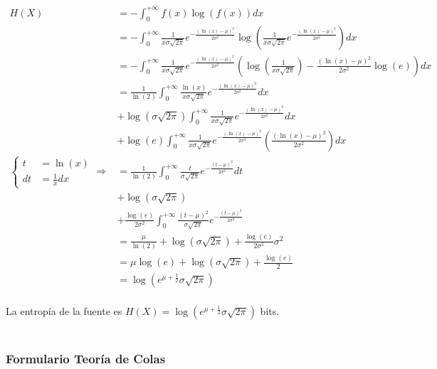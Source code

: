 \documentclass{article}
\begin{document}
\begin{align*}
H(X)&= -\int_{0}^{+\infty}f(x)\log\left(f(x)\right)dx\\
&= -\int_{0}^{+\infty}\frac{1}{x\sigma\sqrt{2\pi}}e^{-\frac{(\ln\left(x\right)-\mu)^2}{2\sigma^2}}\log\left(\frac{1}{x\sigma\sqrt{2\pi}}e^{-\frac{(\ln\left(x\right)-\mu)^2}{2\sigma^2}}\right)dx\\
&= -\int_{0}^{+\infty}\frac{1}{x\sigma\sqrt{2\pi}}e^{-\frac{(\ln\left(x\right)-\mu)^2}{2\sigma^2}}\left(\log\left(\frac{1}{x\sigma\sqrt{2\pi}}\right)-\frac{(\ln\left(x\right)-\mu)^2}{2\sigma^2}\log\left(e\right)\right)dx\\
&= \frac{1}{\ln\left(2\right)}\int_{0}^{+\infty}\frac{\ln\left(x\right)}{x\sigma\sqrt{2\pi}}e^{-\frac{(\ln\left(x\right)-\mu)^2}{2\sigma^2}}dx\\
&+\log\left(\sigma\sqrt{2\pi}\right) \int_{0}^{+\infty}\frac{1}{x\sigma\sqrt{2\pi}}e^{-\frac{(\ln\left(x\right)-\mu)^2}{2\sigma^2}}dx\\
&+\log\left(e\right)\int_{0}^{+\infty}\frac{1}{x\sigma\sqrt{2\pi}}e^{-\frac{(\ln\left(x\right)-\mu)^2}{2\sigma^2}}\left(\frac{(\ln\left(x\right)-\mu)^2}{2\sigma^2}\right)dx\\
\begin{cases}t&=\ln(x)\\dt&=\frac{1}{x}dx\end{cases}\Rightarrow&= \frac{1}{\ln\left(2\right)}\int_{0}^{+\infty}\frac{t}{\sigma\sqrt{2\pi}}e^{-\frac{(t-\mu)^2}{2\sigma^2}}dt\\
&+\log\left(\sigma\sqrt{2\pi}\right)\\
&+\frac{\log\left(e\right)}{2\sigma^2}\int_{0}^{+\infty}\frac{(t-\mu)^2}{\sigma\sqrt{2\pi}}e^{-\frac{(t-\mu)^2}{2\sigma^2}}\\
&= \frac{\mu}{\ln\left(2\right)}+\log\left(\sigma\sqrt{2\pi}\right)+\frac{\log\left(e\right)}{2\sigma^2}\sigma^2\\
&= \mu\log\left(e\right)+\log\left(\sigma\sqrt{2\pi}\right)+\frac{\log\left(e\right)}{2}\\
&= \log\left(e^{\mu + \frac{1}{2}}\sigma\sqrt{2\pi}\right)\\
\end{align*}

La entropía de la fuente es $H(X)=\log\left(e^{\mu + \frac{1}{2}}\sigma\sqrt{2\pi}\right)$ bits.\\\\

\subsubsection*{\centering Formulario Teoría de Colas}
\end{document}
